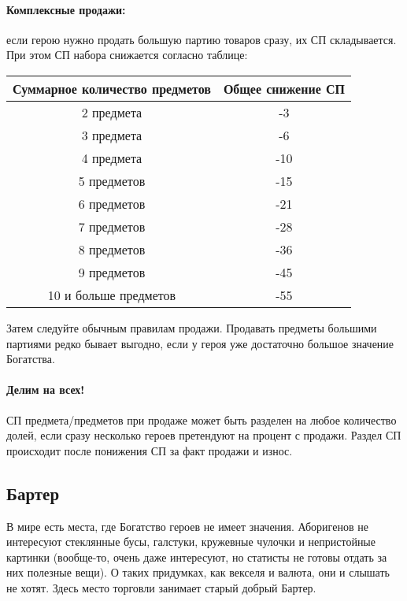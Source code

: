 \paragraph{Комплексные продажи:} если герою нужно продать большую партию товаров сразу, их СП складывается. При этом СП набора снижается согласно таблице:
\begin{center}\begin{tabular}{ |c|c| }\hline
    \textbf{Суммарное количество предметов} & \textbf{Общее снижение СП} \\ \hline
    2 предмета & -3 \\ \hline
    3 предмета & -6 \\ \hline
    4 предмета & -10 \\ \hline
    5 предметов & -15 \\ \hline
    6 предметов & -21 \\ \hline
    7 предметов & -28 \\ \hline
    8 предметов & -36 \\ \hline
    9 предметов & -45 \\ \hline
    10 и больше предметов & -55 \\ \hline
\end{tabular}\end{center}
Затем следуйте обычным правилам продажи. Продавать предметы большими партиями редко бывает выгодно, если у героя уже достаточно большое значение Богатства.
    
\paragraph{Делим на всех!} СП предмета/предметов при продаже может быть разделен на любое количество долей, если сразу несколько героев претендуют на процент с продажи. Раздел СП происходит после понижения СП за факт продажи и износ.

\subsection{Бартер}
В мире есть места, где Богатство героев не имеет значения. Аборигенов не интересуют стеклянные бусы, галстуки, кружевные чулочки и непристойные картинки (вообще-то, очень даже интересуют, но статисты не готовы отдать за них полезные вещи). О таких придумках, как векселя и валюта, они и слышать не хотят. Здесь место торговли занимает старый добрый Бартер.
